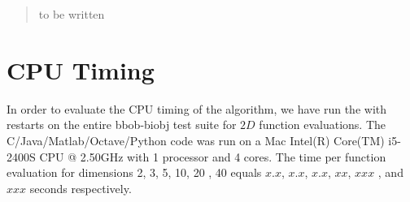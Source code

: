 \documentclass{sig-alternate}
\newcommand{\change}[1]{{\color{red} #1}}
\begin{document}

\maketitle
\begin{abstract}
to be written
\end{abstract}




%
%
%

\section{CPU Timing}
In order to evaluate the CPU timing of the algorithm, we have run the \change{\algorithmA} with restarts on the entire bbob-biobj test suite \cite{biobj2016func} for $2 D$ function evaluations. The \change{C/Java/Matlab/Octave/Python} code was run on a \change{Mac Intel(R) Core(TM) i5-2400S CPU @ 2.50GHz} with \change{1} processor and \change{4} cores. The time per function evaluation for dimensions 2, 3, 5, 10, 20\change{, 40} equals \change{$x.x$}, \change{$x.x$}, \change{$x.x$}, \change{$xx$}, \change{$xxx$}\change{, and $xxx$} seconds respectively. 
\end{document}
